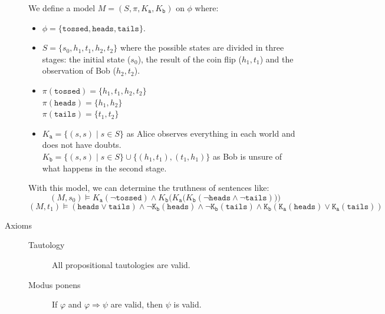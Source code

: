 \begin{description}
\begin{example}
            We define a model $M = (S, \pi, K_\texttt{a}, K_\texttt{b})$ on $\phi$ where:
            \begin{itemize}
                \item $\phi = \{ \texttt{tossed}, \texttt{heads}, \texttt{tails} \}$.
                \item $S = \{ s_0, h_1, t_1, h_2, t_2 \}$ where the possible states are divided in three stages:
                    the initial state ($s_0$), the result of the coin flip ($h_1, t_1$) and the observation of Bob ($h_2, t_2$).
                \item 
                    $\pi(\texttt{tossed}) = \{ h_1, t_1, h_2, t_2 \}$\\
                    $\pi(\texttt{heads}) = \{ h_1, h_2 \}$\\
                    $\pi(\texttt{tails}) = \{ t_1, t_2 \}$
                \item 
                    $K_\texttt{a} = \{ (s, s) \mid s \in S \}$ as Alice observes everything in each world and does not have doubts.\\
                    $K_\texttt{b} = \{ (s, s) \mid s \in S \} \cup \{ (h_1, t_1), (t_1, h_1) \}$ as Bob is unsure of what happens in the second stage.\\
            \end{itemize}
            \vspace*{-1em}
            With this model, we can determine the truthness of sentences like:
            \[ (M, s_0) \models K_\texttt{a}(\lnot\texttt{tossed}) \land K_\texttt{b}\Big(K_\texttt{a}\big(K_\texttt{b}(\lnot \texttt{heads} \land \lnot \texttt{tails})\big)\Big) \]
            \[ (M, t_1) \models (\texttt{heads} \vee \texttt{tails}) \land \lnot\texttt{K}_\texttt{b}(\texttt{heads}) \land 
                \lnot\texttt{K}_\texttt{b}(\texttt{tails}) \land 
                \texttt{K}_\texttt{b}(\texttt{K}_\texttt{a}(\texttt{heads}) \vee \texttt{K}_\texttt{a}(\texttt{tails})) \]
        \end{example}
    
    \item[Axioms] \phantom{}
        \begin{description}
            \item[Tautology] 
                All propositional tautologies are valid.

            \item[Modus ponens] 
                If $\varphi$ and $\varphi \Rightarrow \psi$ are valid, then $\psi$ is valid.


\end{description}
\end{description}

